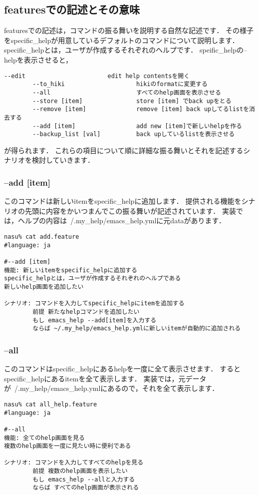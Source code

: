 
\subsection{featuresでの記述とその意味}
featuresでの記述は，コマンドの振る舞いを説明する自然な記述です．
その様子をspecific\_helpが用意しているデフォルトのコマンドについて説明します．
specific\_helpとは，ユーザが作成するそれぞれのヘルプです．
speific\_helpの--helpを表示させると，
\begin{lstlisting}[style=customCsh,basicstyle={\scriptsize\ttfamily}]
        --edit                       edit help contentsを開く
        --to_hiki                    hikiのformatに変更する
        --all                        すべてのhelp画面を表示させる
        --store [item]               store [item] でback upをとる
        --remove [item]              remove [item] back upしてるlistを消去する
        --add [item]                 add new [item]で新しいhelpを作る
        --backup_list [val]          back upしているlistを表示させる
\end{lstlisting}
が得られます．
これらの項目について順に詳細な振る舞いとそれを記述するシナリオを検討していきます．

\subsubsection{--add [item]}
このコマンドは新しいitemをspecific\_helpに追加します．
提供される機能をシナリオの先頭に内容をかいつまんでこの振る舞いが記述されています．
実装では，ヘルプの内容は~/.my\_help/emacs\_help.ymlに元dataがあります．
\begin{lstlisting}[style=customRuby,basicstyle={\scriptsize\ttfamily}]
nasu% cat add.feature
#language: ja

#--add [item]
機能: 新しいitemをspecific_helpに追加する
specific_helpとは，ユーザが作成するそれぞれのヘルプである
新しいhelp画面を追加したい

シナリオ: コマンドを入力してspecific_helpにitemを追加する
        前提 新たなhelpコマンドを追加したい
        もし emacs_help --add[item]を入力する
        ならば ~/.my_help/emacs_help.ymlに新しいitemが自動的に追加される

\end{lstlisting}
\subsubsection{--all}
このコマンドはspecific\_helpにあるhelpを一度に全て表示させます．
するとspecific\_helpにあるitemを全て表示します．
実装では，元データが~/.my\_help/emacs\_help.ymlにあるので，それを全て表示します．
\begin{lstlisting}[style=customRuby,basicstyle={\scriptsize\ttfamily}]
nasu% cat all_help.feature
#language: ja

#--all
機能: 全てのhelp画面を見る
複数のhelp画面を一度に見たい時に便利である

シナリオ: コマンドを入力してすべてのhelpを見る
        前提 複数のhelp画面を表示したい
        もし emacs_help --allと入力する
        ならば すべてのhelp画面が表示される
\end{lstlisting}

